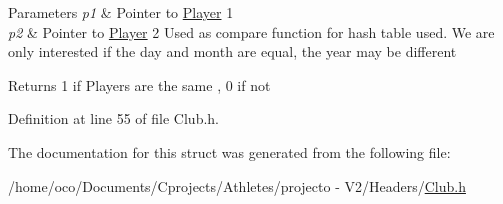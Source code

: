 \begin{DoxyParams}{Parameters}
{\em p1} & Pointer to \hyperlink{class_player}{Player} 1 \\
\hline
{\em p2} & Pointer to \hyperlink{class_player}{Player} 2 Used as compare function for hash table used. We are only interested if the day and month are equal, the year may be different \\
\hline
\end{DoxyParams}
\begin{DoxyReturn}{Returns}
1 if Players are the same , 0 if not 
\end{DoxyReturn}


Definition at line 55 of file Club.\+h.



The documentation for this struct was generated from the following file\+:\begin{DoxyCompactItemize}
\item 
/home/oco/\+Documents/\+Cprojects/\+Athletes/projecto -\/ V2/\+Headers/\hyperlink{_club_8h}{Club.\+h}\end{DoxyCompactItemize}
